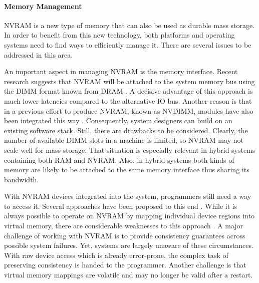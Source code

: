 
\paragraph{Memory Management}

\ac{NVRAM} is a new type of memory that can also be used as durable mass
storage. In order to benefit from this new technology, both platforms and
operating systems need to find ways to efficiently manage it. There are several
issues to be addressed in this area.


An important aspect in managing \ac{NVRAM} is the memory interface. Recent
research suggests that \ac{NVRAM} will be attached to the system memory bus
using the \ac{DIMM} format known from \ac{DRAM} \cite{volos2017whisper,
oukid2017data, andrei2017sap, intel2017nvdimm}. A decisive advantage of this
approach is much lower latencies compared to the alternative \ac{IO} bus.
Another reason is that in a previous effort to produce \ac{NVRAM}, known as
\ac{NVDIMM}, modules have also been integrated this way \cite{dulloor2014system,
huang2014design}. Consequently, system designers can build on an existing
software stack. Still, there are drawbacks to be considered. Clearly, the number
of available \ac{DIMM} slots in a machine is limited, so \ac{NVRAM} may not
scale well for mass storage. That situation is especially relevant in hybrid
systems containing both \ac{RAM} and \ac{NVRAM}. Also, in hybrid systems both
kinds of memory are likely to be attached to the same memory interface thus
sharing its bandwidth.

With \ac{NVRAM} devices integrated into the system, programmers still need a way
to access it. Several approaches have been proposed to this end
\cite{volos2017whisper}. While it is always possible to operate on \ac{NVRAM} by
mapping individual device regions into virtual memory, there are considerable
weaknesses to this approach \cite{condit2009better, volos2011mnemosyne,
dulloor2014system, volos2017whisper}. A major challenge of working with
\ac{NVRAM} is to provide consistency guarantees across possible system failures.
Yet, systems are largely unaware of these circumstances. With raw device access
which is already error-prone, the complex task of preserving consistency is
handed to the programmer. Another challenge is that virtual memory mappings are
volatile and may no longer be valid after a restart.

